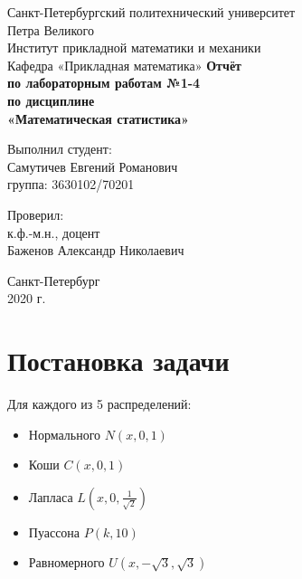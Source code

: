 \documentclass[12pt,a4paper]{article}
\begin{document}
	
\begin{titlepage}
	\begin{center}		
		\vfill	
		Санкт-Петербургский политехнический университет \\
		Петра Великого\\
		\vskip 1cm
		Институт прикладной математики и механики \\
		Кафедра «Прикладная математика»
		\vfill
		\textbf{Отчёт\\
			по лабораторным работам №1-4\\
			по дисциплине\\
			«Математическая статистика»\\}
		\vfill
	\end{center}
	\vfill
	\hfill
	\begin{minipage}{0.4\textwidth}
		Выполнил студент:\\
		Самутичев Евгений Романович\\
		группа: 3630102/70201\\
	\end{minipage}
	\vfill
	\hfill 
	\begin{minipage}{0.4\textwidth}
		Проверил:\\
		к.ф.-м.н., доцент\\
		Баженов Александр Николаевич\
	\end{minipage}
	\vfill
	\begin{center}
		Санкт-Петербург\\2020 г.
	\end{center}
\end{titlepage}

\tableofcontents
\listoffigures
\listoftables
\pagebreak

\section{Постановка задачи}
Для каждого из 5 распределений:

\begin{itemize}
	\item Нормального $N(x, 0, 1)$
	\item Коши $C(x, 0, 1)$
	\item Лапласа $L(x, 0, \frac{1}{\sqrt{2}})$
	\item Пуассона $P(k, 10)$
	\item Равномерного $U(x, -\sqrt{3}, \sqrt{3})$	
\end{itemize}
\end{document}
